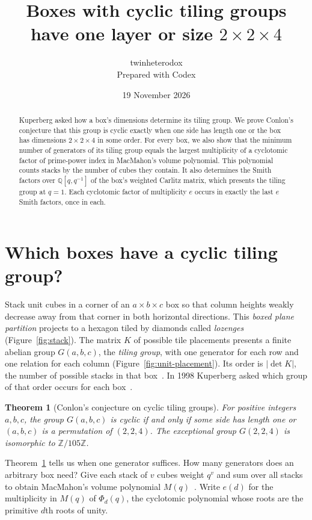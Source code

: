 \documentclass[11pt]{article}
\title{\Large\bfseries Boxes with cyclic tiling groups have one layer or size \(2\times2\times4\)}
\author{twinheterodox\\[2pt]\normalsize Prepared with Codex}
\date{19 November 2026}
\newtheorem{theorem}{Theorem}
\newcommand{\Z}{\mathbb Z}
\newcommand{\Q}{\mathbb Q}
\begin{document}
\maketitle

\begin{abstract}
Kuperberg asked how a box's dimensions determine its tiling group.
We prove Conlon's conjecture that this group is cyclic exactly when one
side has length one or the box has dimensions \(2\times2\times4\) in some order.
For every box, we also show that the minimum number of generators of its
tiling group equals the largest multiplicity of a cyclotomic factor of
prime-power index in MacMahon's volume polynomial.
This polynomial counts stacks by the number of cubes they contain.
It also determines the Smith factors over \(\Q[q,q^{-1}]\) of the box's
weighted Carlitz matrix, which presents the tiling group at \(q=1\). Each
cyclotomic factor of multiplicity \(e\) occurs in exactly the last
\(e\) Smith factors, once in each.
\end{abstract}

\section{Which boxes have a cyclic tiling group?}

Stack unit cubes in a corner of an \(a\times b\times c\) box so that
column heights weakly decrease away from that corner in both horizontal
directions. This \emph{boxed plane partition} projects to a hexagon tiled
by diamonds called \emph{lozenges} (Figure~\ref{fig:stack}). The matrix
\(K\) of possible tile placements presents a finite abelian group
\(G(a,b,c)\), the \emph{tiling group}, with one generator for each row
and one relation for each column (Figure~\ref{fig:unit-placement}).
Its order is \(\lvert\det K\rvert\), the number of possible stacks
in that box~\cite[p.~265]{Propp}. In 1998 Kuperberg asked which group
of that order occurs for each box~\cite[Question~2]{Kuperberg1998}.

\begin{theorem}[Conlon's conjecture on cyclic tiling groups]\label{thm:cyclic}
For positive integers \(a,b,c\), the group \(G(a,b,c)\) is cyclic if
and only if some side has length one or \((a,b,c)\) is a permutation
of \((2,2,4)\). The exceptional group \(G(2,2,4)\) is isomorphic to
\(\Z/105\Z\).
\end{theorem}

Theorem~\ref{thm:cyclic} tells us when one generator suffices. How many
generators does an arbitrary box need? Give each stack of \(v\) cubes
weight \(q^v\) and sum over all stacks to obtain MacMahon's volume
polynomial \(M(q)\)~\cite[\S429]{MacMahon}. Write \(e(d)\) for the
multiplicity in \(M(q)\) of \(\Phi_d(q)\), the cyclotomic polynomial
whose roots are the primitive \(d\)th roots of unity.
\end{document}
